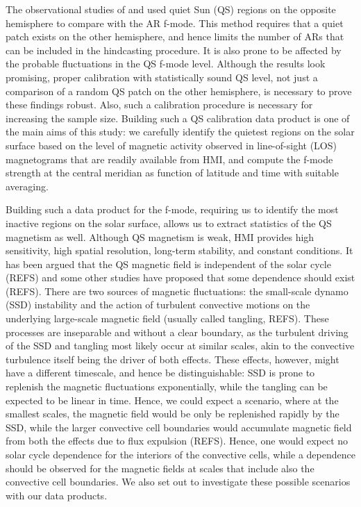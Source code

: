 \documentclass{aa}
\begin{document}
The observational studies of \cite{SRB16} and \cite{Waidele22} used quiet Sun (QS)
regions on the opposite hemisphere to compare with the AR f-mode. This method
requires that a quiet patch exists on the other hemisphere, and hence 
limits the number of ARs that can be included in the hindcasting procedure. It is
also prone to be affected by the probable fluctuations in the QS
f-mode level. Although the results look promising, proper calibration with
statistically sound QS level, not just a comparison of a random QS patch on the
other hemisphere, is necessary to prove these findings robust. Also,
such a calibration procedure is necessary for increasing the sample size. 
Building such a QS calibration data product is one of the main aims of this
study: we carefully identify the quietest regions on the solar surface based on the level of magnetic activity observed in
line-of-sight (LOS) magnetograms that are readily available from HMI, and
compute the f-mode strength at the central meridian as function of latitude
and time with suitable averaging. 

Building such a data product for the f-mode, requiring us to identify the most
inactive regions on the solar surface, allows us to extract statistics
of the QS magnetism as well. 
Although QS magnetism is weak, HMI provides high sensitivity, high spatial
resolution, long-term stability, and constant conditions.
It has been argued that the QS magnetic field is 
independent of the solar cycle (REFS) and some other studies have proposed
that some dependence should exist (REFS). There are two sources of magnetic
fluctuations: the small-scale dynamo (SSD) instability and the action of turbulent
convective motions on the underlying large-scale magnetic field (usually
called tangling, REFS). These processes are inseparable and without a clear boundary, 
as the turbulent driving of the SSD and tangling most likely occur at similar
scales, akin to the convective turbulence itself being the driver of both
effects. These effects, however, might have a different timescale, and hence
be distinguishable: SSD is prone to replenish the magnetic fluctuations 
exponentially, while the tangling can be expected to be linear in time.  
Hence, we could expect a scenario, where at the smallest scales, the magnetic
field would be only be replenished rapidly by the SSD, while the larger
convective cell boundaries would accumulate magnetic field from both the
 effects due to flux expulsion (REFS). Hence, one would expect no solar cycle
 dependence for the interiors of the convective cells, while a dependence
  should be observed for the magnetic fields at scales that include also
  the convective cell boundaries. We also set out to investigate these
  possible scenarios with our data products. 
\end{document}
